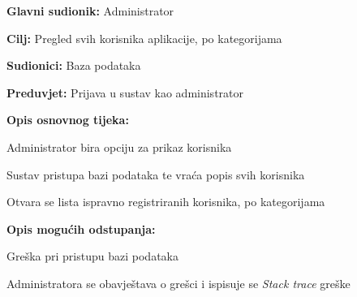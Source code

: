 					\noindent {}
					\begin{packed_item}
						
						\item \textbf{Glavni sudionik: }Administrator
						\item  \textbf{Cilj:} Pregled svih korisnika aplikacije, po kategorijama
						\item  \textbf{Sudionici:} Baza podataka
						\item  \textbf{Preduvjet:} Prijava u sustav kao administrator
						\item  \textbf{Opis osnovnog tijeka:}
						
						\item[] \begin{packed_enum}
							
							\item Administrator bira opciju za prikaz korisnika
							\item Sustav pristupa bazi podataka te vraća popis svih korisnika
							\item Otvara se lista ispravno registriranih korisnika, po kategorijama
						\end{packed_enum}
						\item \textbf{Opis mogućih odstupanja:}
						\item[] \begin{packed_item}
							
							\item[2.a] Greška pri pristupu bazi podataka
							\item[] \begin{packed_enum}
								
								\item Administratora se obavještava o grešci i ispisuje se \textit{Stack trace} greške
								
							\end{packed_enum}
						\end{packed_item}
					\end{packed_item}
					\clearpage
					

